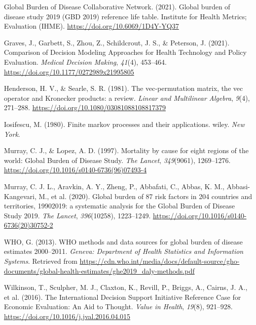 \documentclass[
]{agujournal2019}
\newlength{\cslhangindent}
\newenvironment{CSLReferences}[2] %
 {\begin{list}{}{%
  \setlength{\itemindent}{0pt}
  \setlength{\leftmargin}{0pt}
  \setlength{\parsep}{0pt}
  \ifodd #1
   \setlength{\leftmargin}{\cslhangindent}
   \setlength{\itemindent}{-1\cslhangindent}
  \fi
  \setlength{\itemsep}{#2\baselineskip}}}
 {\end{list}}
\begin{document}
\begin{CSLReferences}{1}{0}
Global Burden of Disease Collaborative Network. (2021). Global burden of
disease study 2019 (GBD 2019) reference life table. Institute for Health
Metrics; Evaluation (IHME). \url{https://doi.org/10.6069/1D4Y-YQ37}

Graves, J., Garbett, S., Zhou, Z., Schildcrout, J. S., \& Peterson, J.
(2021). Comparison of Decision Modeling Approaches for Health Technology
and Policy Evaluation. \emph{Medical Decision Making}, \emph{41}(4),
453--464. \url{https://doi.org/10.1177/0272989x21995805}

Henderson, H. V., \& Searle, S. R. (1981). The vec-permutation matrix,
the vec operator and Kronecker products: a review. \emph{Linear and
Multilinear Algebra}, \emph{9}(4), 271--288.
\url{https://doi.org/10.1080/03081088108817379}

Iosifescu, M. (1980). Finite markov processes and their applications.
wiley. \emph{New York}.

Murray, C. J., \& Lopez, A. D. (1997). Mortality by cause for eight
regions of the world: Global Burden of Disease Study. \emph{The Lancet},
\emph{349}(9061), 1269--1276.
\url{https://doi.org/10.1016/s0140-6736(96)07493-4}

Murray, C. J. L., Aravkin, A. Y., Zheng, P., Abbafati, C., Abbas, K. M.,
Abbasi-Kangevari, M., et al. (2020). Global burden of 87 risk factors in
204 countries and territories, 1990{\textendash}2019: a systematic
analysis for the Global Burden of Disease Study 2019. \emph{The Lancet},
\emph{396}(10258), 1223--1249.
\url{https://doi.org/10.1016/s0140-6736(20)30752-2}

WHO, G. (2013). WHO methods and data sources for global burden of
disease estimates 2000--2011. \emph{Geneva: Department of Health
Statistics and Information Systems}. Retrieved from
\url{https://cdn.who.int/media/docs/default-source/gho-documents/global-health-estimates/ghe2019_daly-methods.pdf}

Wilkinson, T., Sculpher, M. J., Claxton, K., Revill, P., Briggs, A.,
Cairns, J. A., et al. (2016). The International Decision Support
Initiative Reference Case for Economic Evaluation: An Aid to Thought.
\emph{Value in Health}, \emph{19}(8), 921--928.
\url{https://doi.org/10.1016/j.jval.2016.04.015}

\end{CSLReferences}
\end{document}
